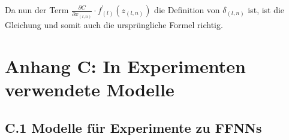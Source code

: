 \documentclass[a4paper,12pt,ngerman,oneside]{scrreprt}	%
\begin{document}
			Da nun der Term $\frac{\partial C}{\partial x_{(l,n)}} \cdot f_{(l)}^{\prime}(z_{(l,n)})$ die Definition von $\delta_{(l,n)}$ ist, ist die Gleichung und somit auch die ursprüngliche Formel richtig.


		\newpage
		\vspace*{2cm}
		\section*{Anhang C: In Experimenten verwendete Modelle}
			
			\subsection*{C.1 Modelle für Experimente zu FFNNs}
\end{document}
